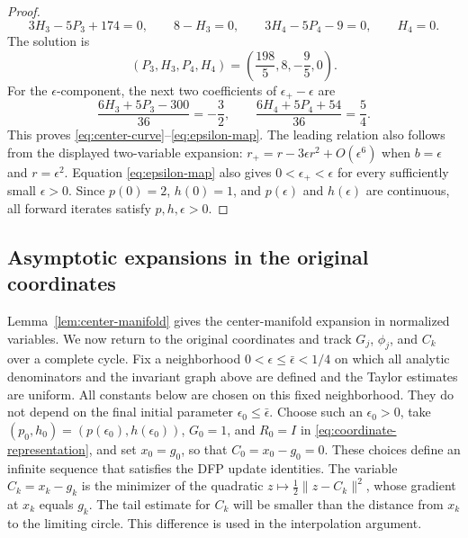 \documentclass[11pt]{article}
\begin{document}
\begin{proof}
\begin{equation}
3H_3-5P_3+174=0,\qquad 8-H_3=0,\qquad
3H_4-5P_4-9=0,\qquad H_4=0.
\end{equation}
The solution is
\[
(P_3,H_3,P_4,H_4)=\left(\frac{198}{5},8,-\frac95,0\right).
\]
For the $\epsilon$-component, the next two coefficients of
$\epsilon_+-\epsilon$ are
\[
\frac{6H_3+5P_3-300}{36}=-\frac32,
\qquad
\frac{6H_4+5P_4+54}{36}=\frac54.
\]
This proves \eqref{eq:center-curve}--\eqref{eq:epsilon-map}.  The leading
relation also follows from the displayed two-variable expansion:
$r_+=r-3\epsilon r^2+O(\epsilon^6)$ when
$b=\epsilon$ and $r=\epsilon^2$.
Equation \eqref{eq:epsilon-map} also gives
$0<\epsilon_+<\epsilon$ for every sufficiently small $\epsilon>0$.
Since $p(0)=2$, $h(0)=1$, and $p(\epsilon)$ and $h(\epsilon)$ are continuous,
all forward iterates satisfy $p,h,\epsilon>0$.
\end{proof}

\subsection{Asymptotic expansions in the original coordinates}

Lemma~\ref{lem:center-manifold} gives the center-manifold expansion in
normalized variables.  We now return to the original coordinates and track
$G_j$, $\phi_j$, and $C_k$ over a complete cycle.  Fix a neighborhood
$0<\epsilon\le\bar\epsilon<1/4$ on which all analytic denominators and the
invariant graph above are defined and the Taylor estimates are uniform.  All
constants below are chosen on this fixed neighborhood.  They do not depend on
the final initial parameter
$\epsilon_0\le\bar\epsilon$.  Choose such an $\epsilon_0>0$, take
$(p_0,h_0)=(p(\epsilon_0),h(\epsilon_0))$, $G_0=1$, and $R_0=I$ in
\eqref{eq:coordinate-representation}, and set $x_0=g_0$, so that
$C_0=x_0-g_0=0$.
These choices define an infinite sequence that satisfies the DFP update
identities.
The variable $C_k=x_k-g_k$ is the minimizer of the quadratic
$z\mapsto\frac12\|z-C_k\|^2$, whose gradient at $x_k$ equals $g_k$.
The tail estimate for $C_k$ will be smaller than the distance from $x_k$ to the
limiting circle.  This difference is used in the interpolation argument.
\end{document}
